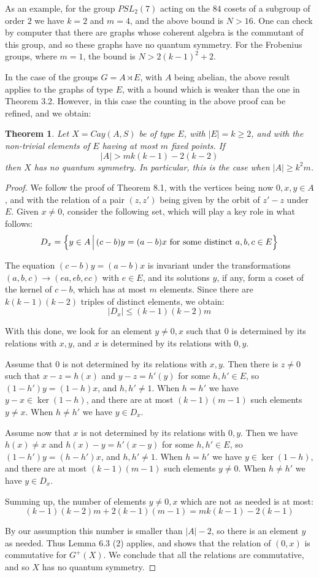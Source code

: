 \documentclass[11pt]{amsart}
\newtheorem{theorem}{Theorem}[section]
\begin{document}
As an example, for the group $PSL_2(7)$ acting on the $84$ cosets of a subgroup of order $2$ we have $k=2$ and $m=4$, and the above bound is $N>16$. One can check by computer that there are graphs whose coherent algebra is the commutant of this group, and so these graphs have no quantum symmetry. For the Frobenius groups, where $m=1$, the bound is $N>2(k-1)^2+2$.

In the case of the groups $G=A\rtimes E$, with $A$ being abelian, the above result applies to the graphs of type $E$, with a bound which is weaker than the one in Theorem 3.2. However, in this case the counting in the above proof can be refined, and we obtain:

\begin{theorem}
Let $X=Cay(A,S)$ be of type $E$, with $|E|=k\geq2$, and with the non-trivial elements of $E$ having at most $m$ fixed points. If
$$|A|>mk(k-1)-2(k-2)$$
then $X$ has no quantum symmetry. In particular, this is the case when $|A|\geq k^2m$.
\end{theorem}

\begin{proof}
We follow the proof of Theorem 8.1, with the vertices being now $0,x,y\in A$, and with the relation of a pair $(z,z')$ being given by the orbit of $z'-z$ under $E$. Given $x\neq0$, consider the following set, which will play a key role in what follows:
$$D_x=\left\{y\in A\,\Big|\,(c-b)y=(a-b)x\ {\rm for\ some\ distinct}\ a,b,c\in E\right\}$$

The equation $(c-b)y=(a-b)x$ is invariant under the transformations $(a,b,c)\to(ea,eb,ec)$ with $e\in E$, and its solutions $y$, if any, form a coset of the kernel of $c-b$, which has at most $m$ elements. Since there are $k(k-1)(k-2)$ triples of distinct elements, we obtain:
$$|D_x|\leq(k-1)(k-2)m$$

With this done, we look for an element $y\neq0,x$ such that $0$ is determined by its relations with $x,y$, and $x$ is determined by its relations with $0,y$.

Assume that $0$ is not determined by its relations with $x,y$. Then there is $z\neq0$ such that $x-z=h(x)$ and $y-z=h'(y)$ for some $h,h'\in E$, so $(1-h')y=(1-h)x$, and $h,h'\neq1$. When $h=h'$ we have $y-x\in\ker(1-h)$, and there are at most $(k-1)(m-1)$ such elements $y\neq x$. When $h\neq h'$ we have $y\in D_x$.

Assume now that $x$ is not determined by its relations with $0,y$. Then we have $h(x)\neq x$ and $h(x)-y=h'(x-y)$ for some $h,h'\in E$, so $(1-h')y=(h-h')x$, and $h,h'\neq1$. When $h=h'$ we have $y\in\ker(1-h)$, and there are at most $(k-1)(m-1)$ such elements $y\neq0$. When $h\neq h'$ we have $y\in D_x$.

Summing up, the number of elements $y\neq0,x$ which are not as needed is at most:
$$(k-1)(k-2)m+2(k-1)(m-1)=mk(k-1)-2(k-1)$$

By our assumption this number is smaller than $|A|-2$, so there is an element $y$ as needed. Thus Lemma 6.3 (2) applies, and shows that the relation of $(0,x)$ is commutative for $G^+(X)$. We conclude that all the relations are commutative, and so $X$ has no quantum symmetry.
\end{proof}
\end{document}
